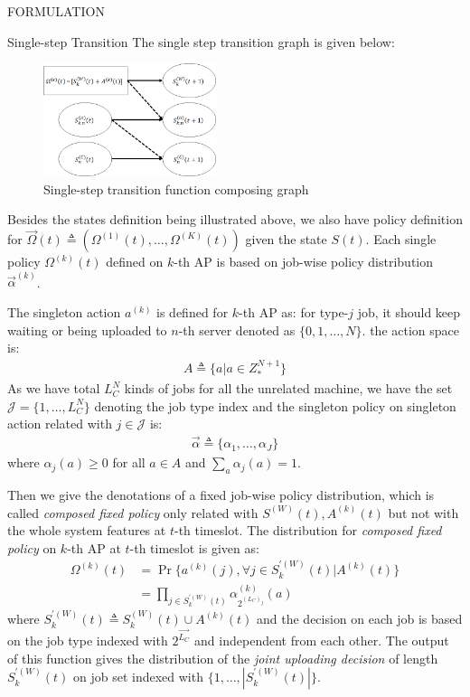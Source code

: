 \documentclass[10pt, conference, letterpaper]{IEEEtran}
\begin{document}
\begin{section}{FORMULATION}
\begin{subsection}{Single-step Transition}
            The single step transition graph is given below:
            \begin{figure}[h]
                \centering
                \includegraphics[width=0.45\textwidth]{single-transition.png}
                \caption{Single-step transition function composing graph}
                \label{fig:trans}
            \end{figure}
            Besides the states definition being illustrated above, we also have policy definition for $\vec{\Omega}(t) \triangleq (\Omega^{(1)}(t), \dots, \Omega^{(K)}(t))$ given the state $S(t)$. Each single policy $\Omega^{(k)}(t)$ defined on $k$-th AP is based on job-wise policy distribution $\vec{\alpha}^{(k)}$.

            The singleton action $a^{(k)}$ is defined for $k$-th AP as: for type-$j$ job, it should keep waiting or being uploaded to $n$-th server denoted as $\{0,1,\dots,N\}$. the action space is:
            \begin{align}
                A \triangleq \{a|a \in Z_*^{N+1}\}
            \end{align}
            As we have total $L_C^{N}$ kinds of jobs for all the unrelated machine, we have the set $\mathcal{J}=\{1, \dots, L_C^{N}\}$ denoting the job type index and the singleton policy on singleton action related with $j \in \mathcal{J}$ is:
            \begin{align}
                \vec{\alpha} \triangleq \{\alpha_1,\dots,\alpha_J\}
            \end{align}
            where $\alpha_j(a) \geq 0$ for all $a \in A$ and $\sum_a \alpha_j(a) = 1$.

            Then we give the denotations of a fixed job-wise policy distribution, which is called \emph{composed fixed policy} only related with $S^{(W)}(t), A^{(k)}(t)$ but not with the whole system features at $t$-th timeslot. The distribution for \emph{composed fixed policy} on $k$-th AP at $t$-th timeslot is given as:
            \begin{align}
                \Omega^{(k)}(t) &= \Pr\{a^{(k)}(j), \forall j \in S^{'(W)}_k(t) | A^{(k)}(t)\}
                \nonumber\\
                &= \prod_{j \in S^{'(W)}_k(t)} \alpha_{2^{(L_C)_j}}^{(k)}(a)
            \end{align}
            where $S^{'(W)}_k(t) \triangleq S^{(W)}_k(t) \cup A^{(k)}(t)$ and the decision on each job is based on the job type indexed with $2^{\vec{L_C}}$ and independent from each other. The output of this function gives the distribution of the \emph{joint uploading decision} of length $S^{'(W)}_k(t)$ on job set indexed with $\{1,\dots,|S^{'(W)}_k(t)|\}$.


\end{subsection}
\end{section}
\end{document}
